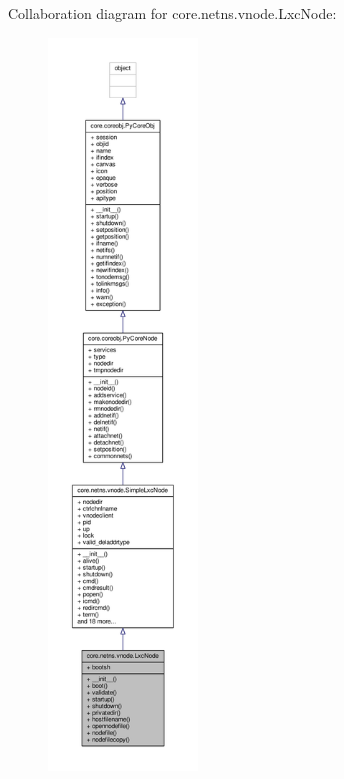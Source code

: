 Collaboration diagram for core.\+netns.\+vnode.\+Lxc\+Node\+:
\nopagebreak
\begin{figure}[H]
\begin{center}
\leavevmode
\includegraphics[height=550pt]{classcore_1_1netns_1_1vnode_1_1_lxc_node__coll__graph}
\end{center}
\end{figure}
